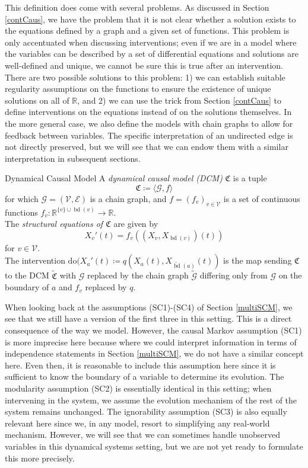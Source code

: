 \documentclass[11pt, a4paper]{memoir}
\theoremstyle{break}
\theoremstyle{break}
\theoremstyle{nonumberplain}
\newcommand{\mR}{\mathbb{R}}
\DeclareMathOperator{\bd}{bd}
\begin{document}
This definition does come with several problems. As discussed in Section \ref{contCaus}, we have the problem that it is not clear whether a solution exists to the equations defined by a graph and a given set of functions. This problem is only accentuated when discussing interventions; even if we are in a model where the variables can be described by a set of differential equations and solutions are well-defined and unique, we cannot be sure this is true after an intervention. There are two possible solutions to this problem: 1) we can establish suitable regularity assumptions on the functions to ensure the existence of unique solutions on all of $\mR$, and 2) we can use the trick from Section \ref{contCaus} to define interventions on the equations instead of on the solutions themselves. In the more general case, we also define the models with chain graphs to allow for feedback between variables. The specific interpretation of an undirected edge is not directly preserved, but we will see that we can endow them with a similar interpretation in subsequent sections.
\begin{mydefinition}{Dynamical Causal Model}
A \emph{dynamical causal model (DCM)} $\mathfrak{C}$ is a tuple
$$\mathfrak{C}\coloneqq \langle \mathcal{G}, f\rangle$$
for which $\mathcal{G}=(\mathcal{V},\mathcal{E})$ is a chain graph, and $f=(f_v)_{v\in \mathcal{V}}$ is a set of continuous functions $f_v:\mR^{\{v\}\cup \bd(v)}\to \mR$.\\[5pt]
The \emph{structural equations of $\mathfrak{C}$} are given by
$$X_v'(t)=f_v((X_v,X_{\bd(v)})(t))$$
for $v\in \mathcal{V}$.\\[5pt]
The intervention $\text{do}(X_a'(t)\coloneqq q(X_a(t),X_{\tilde{\bd}(a)}(t))$ is the map sending $\mathfrak{C}$ to the DCM $\tilde{\mathfrak{C}}$ with $\mathcal{G}$ replaced by the chain graph $\tilde{\mathcal{G}}$ differing only from $\mathcal{G}$ on the boundary of $a$ and $f_v$ replaced by $q$.
\end{mydefinition}
When looking back at the assumptions (SC1)-(SC4) of Section \ref{multiSCM}, we see that we still have a version of the first three in this setting. This is a direct consequence of the way we model. However, the causal Markov assumption (SC1) is more imprecise here because where we could interpret information in terms of independence statements in Section \ref{multiSCM}, we do not have a similar concept here. Even then, it is reasonable to include this assumption here since it is sufficient to know the boundary of a variable to determine its evolution. The modularity assumption (SC2) is essentially identical in this setting; when intervening in the system, we assume the evolution mechanism of the rest of the system remains unchanged. The ignorability assumption (SC3) is also equally relevant here since we, in any model, resort to simplifying any real-world mechanism. However, we will see that we can sometimes handle unobserved variables in this dynamical systems setting, but we are not yet ready to formulate this more precisely.\\\\
\end{document}
